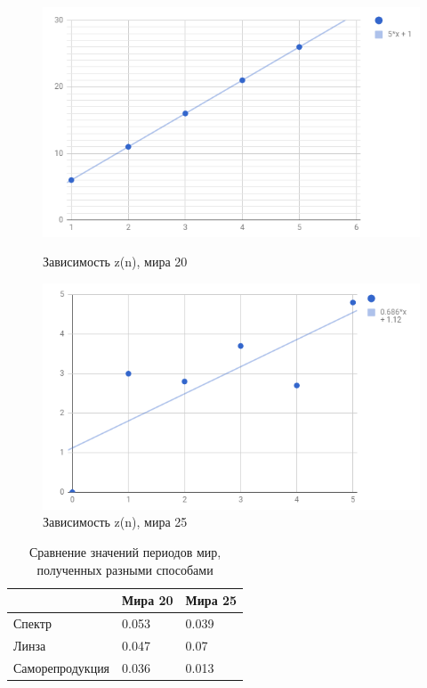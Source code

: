 \documentclass[a4paper]{article}
\begin{document}
\begin{figure}[h]
\begin{center}
\begin{minipage}[h]{0.45\linewidth}
\includegraphics[width=1\linewidth]{m20.PNG}
\caption{Зависимость z(n), мира 20} %
\label{ris:experimoriginal} %
\end{minipage}
\hfill 
\begin{minipage}[h]{0.45\linewidth}
\includegraphics[width=1\linewidth]{m25.PNG}
\caption{Зависимость z(n), мира 25}
\label{ris:experimcoded}
\end{minipage}
\end{center}
\end{figure}

    \begin{table}[b]
    \centering
    \begin{center}
    \caption{Сравнение значений периодов мир, полученных разными способами}
    \end{center}
    \vspace{0.1cm}
    \label{tab:my_label}
    \begin{tabular}{ |p{3cm}||p{3cm}|p{3cm}|}
 \hline
 & Мира 20 & Мира 25\\
 \hline
 Спектр & 0.053 & 0.039 \\
\hline
 Линза & 0.047 & 0.07 \\
\hline
 Саморепродукция & 0.036 &  0.013\\
\hline

 
\end{tabular}
\end{table}
\end{document}
